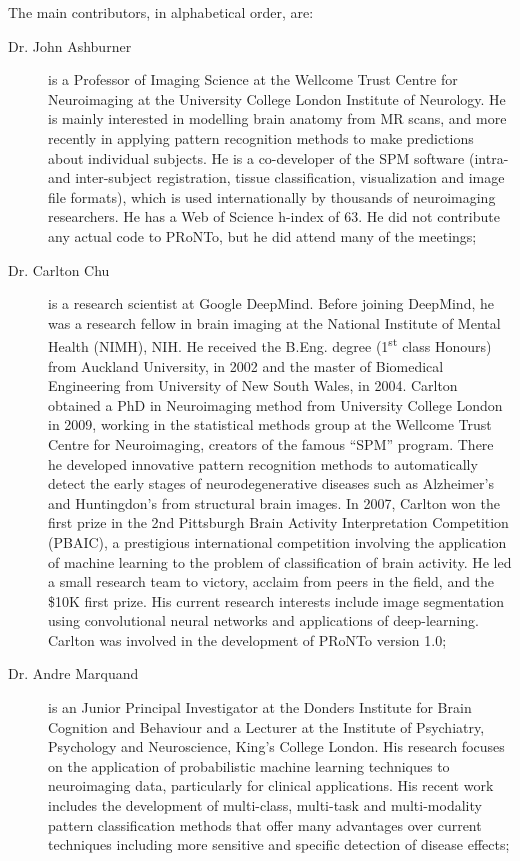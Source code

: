 The main contributors, in alphabetical order, are: 
\begin{description}
	\item[Dr. John Ashburner] is a Professor of Imaging Science at the Wellcome Trust Centre for Neuroimaging at the University College London Institute of Neurology. He is mainly interested in modelling brain anatomy from MR scans, and more recently in applying pattern recognition methods to make predictions about individual subjects. He is a co-developer of the SPM software (intra- and inter-subject registration, tissue classification, visualization and image file formats), which is used internationally by thousands of neuroimaging researchers. He has a Web of Science h-index of 63.  He did not contribute any actual code to PRoNTo, but he did attend many of the meetings;
    \item[Dr. Carlton Chu] is a research scientist at  Google DeepMind. Before joining DeepMind, he was a research fellow in brain imaging at the National Institute of Mental Health (NIMH), NIH. He received the B.Eng. degree (1\textsuperscript{st} class Honours) from Auckland University, in 2002 and the master of Biomedical Engineering from University of New South Wales, in 2004. Carlton obtained a PhD in Neuroimaging method from University College London in 2009, working in the statistical methods group at the Wellcome Trust Centre for Neuroimaging, creators of the famous ``SPM'' program. There he developed innovative pattern recognition methods to automatically detect the early stages of neurodegenerative diseases such as Alzheimer's and Huntingdon's from structural brain images. In 2007, Carlton won the first prize in the 2nd Pittsburgh Brain Activity Interpretation Competition (PBAIC), a prestigious international competition involving the application of machine learning to the problem of classification of brain activity. He led a small research team to victory, acclaim from peers in the field, and the \$10K first prize. His current research interests include image segmentation using convolutional neural networks and applications of deep-learning. Carlton was involved in the development of PRoNTo version 1.0;
	\item[Dr. Andre Marquand] is an Junior Principal Investigator at the Donders Institute for Brain Cognition and Behaviour and a Lecturer at the Institute of Psychiatry, Psychology and Neuroscience, King's College London.  His research focuses on the application of probabilistic machine learning techniques to neuroimaging data, particularly for clinical applications. His recent work includes the development of multi-class, multi-task and multi-modality pattern classification methods that offer many advantages over current techniques including more sensitive and specific detection of disease effects;

\end{description}
